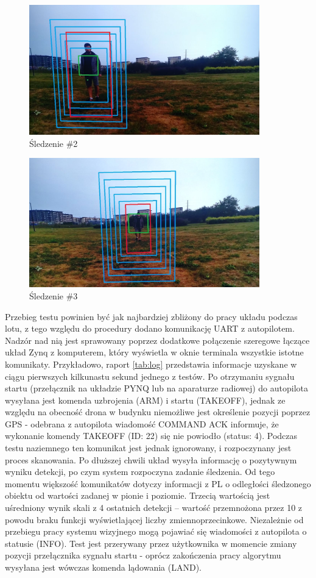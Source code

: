 \begin{figure}[h]
	\centering
	\includegraphics[width=10cm]{6_track_2.jpg}
	\caption{Śledzenie \#2}
	\label{fig:track_1}
\end{figure}

\begin{figure}[h]
	\centering
	\includegraphics[width=10cm]{6_track_3.jpg}
	\caption{Śledzenie \#3}
	\label{fig:track_1}
\end{figure}

 Przebieg testu powinien być jak najbardziej zbliżony do pracy układu podczas lotu, z tego względu do procedury dodano komunikację UART z autopilotem. Nadzór nad nią jest sprawowany poprzez dodatkowe połączenie szeregowe łączące układ Zynq z komputerem, który wyświetla w oknie terminala wszystkie istotne komunikaty. Przykładowo, raport \ref{tab:log} przedstawia informacje uzyskane w ciągu pierwszych kilkunastu sekund jednego z testów. Po otrzymaniu sygnału startu (przełącznik na układzie PYNQ lub na aparaturze radiowej) do autopilota wysyłana jest komenda uzbrojenia (ARM) i startu (TAKEOFF), jednak ze względu na obecność drona w budynku niemożliwe jest określenie pozycji poprzez GPS - odebrana z autopilota wiadomość COMMAND ACK informuje, że wykonanie komendy TAKEOFF (ID: 22) się nie powiodło (status: 4). Podczas testu naziemnego ten komunikat jest jednak ignorowany, i rozpoczynany jest proces skanowania. Po dłuższej chwili układ wysyła informację o pozytywnym wyniku detekcji, po czym system rozpoczyna zadanie śledzenia. Od tego momentu większość komunikatów dotyczy informacji z PL o odległości śledzonego obiektu od wartości zadanej w pionie i poziomie. Trzecią wartością jest uśredniony wynik skali z 4 ostatnich detekcji -- wartość przemnożona przez 10 z powodu braku funkcji wyświetlającej liczby zmiennoprzecinkowe. Niezależnie od przebiegu pracy systemu wizyjnego mogą pojawiać się wiadomości z autopilota o statusie (INFO). Test jest przerywany przez użytkownika w momencie zmiany pozycji przełącznika sygnału startu - oprócz zakończenia pracy algorytmu wysyłana jest wówczas komenda lądowania (LAND).
 
